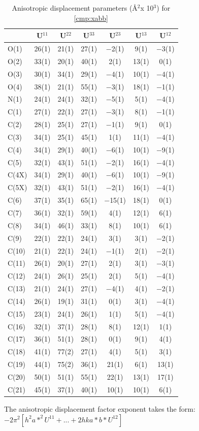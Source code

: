 \onecolumn
\begin{table}[h]
\centering
\footnotesize
\caption{Anisotropic displacement parameters (\AA$^2$x 10$^3$) for \ref{cmp:xabb}} 
\begin{tabular}{p{1in}cccccc} 
\toprule
& U$^{11}$ & U$^{22}$ & U$^{33}$ & U$^{23}$ & U$^{13}$ & U$^{12}$ \\
\midrule
O(1)&26(1)&21(1)&27(1)&$-$2(1)&9(1)&$-$3(1)\\
O(2)&33(1)&20(1)&40(1)&2(1)&13(1)&0(1)\\
O(3)&30(1)&34(1)&29(1)&$-$4(1)&10(1)&$-$4(1)\\
O(4)&38(1)&21(1)&55(1)&$-$3(1)&18(1)&$-$1(1)\\
N(1)&24(1)&24(1)&32(1)&$-$5(1)&5(1)&$-$4(1)\\
C(1)&27(1)&22(1)&27(1)&$-$3(1)&8(1)&$-$1(1)\\
C(2)&28(1)&25(1)&27(1)&$-$1(1)&9(1)&0(1)\\
C(3)&34(1)&25(1)&45(1)&1(1)&11(1)&$-$4(1)\\
C(4)&34(1)&29(1)&40(1)&$-$6(1)&10(1)&$-$9(1)\\
C(5)&32(1)&43(1)&51(1)&$-$2(1)&16(1)&$-$4(1)\\
C(4X)&34(1)&29(1)&40(1)&$-$6(1)&10(1)&$-$9(1)\\
C(5X)&32(1)&43(1)&51(1)&$-$2(1)&16(1)&$-$4(1)\\
C(6)&37(1)&35(1)&65(1)&$-$15(1)&18(1)&0(1)\\
C(7)&36(1)&32(1)&59(1)&4(1)&12(1)&6(1)\\
C(8)&34(1)&46(1)&33(1)&8(1)&10(1)&6(1)\\
C(9)&22(1)&22(1)&24(1)&3(1)&3(1)&$-$2(1) \\
C(10)&21(1)&22(1)&24(1)&$-$1(1)&2(1)&$-$2(1) \\
C(11)&26(1)&20(1)&27(1)&2(1)&3(1)&$-$3(1)\\
C(12)&24(1)&26(1)&25(1)&2(1)&5(1)&$-$4(1)\\
C(13)&21(1)&24(1)&27(1)&$-$4(1)&4(1)&$-$2(1)\\
C(14)&26(1)&19(1)&31(1)&0(1)&3(1)&$-$4(1)\\
C(15)&23(1)&24(1)&26(1)&1(1)&5(1)&$-$4(1)\\
C(16)&32(1)&37(1)&28(1)&8(1)&12(1)&1(1)\\
C(17)&36(1)&51(1)&28(1)&0(1)&9(1)&4(1)\\
C(18)&41(1)&77(2)&27(1)&4(1)&5(1)&3(1)\\
C(19)&44(1)&75(2)&36(1)&21(1)&6(1)&13(1)\\
C(20)&50(1)&51(1)&55(1)&22(1)&13(1)&17(1)\\
C(21)&45(1)&37(1)&40(1)&10(1)&10(1)&6(1)\\
\bottomrule
\end{tabular}
\end{table}
{ \footnotesize
The anisotropic displacement factor exponent takes the form: 
$-2\pi^2\left[ h^2a*^2U^{11} + ... + 2 h k a* b* U^{12} \right]$ }

